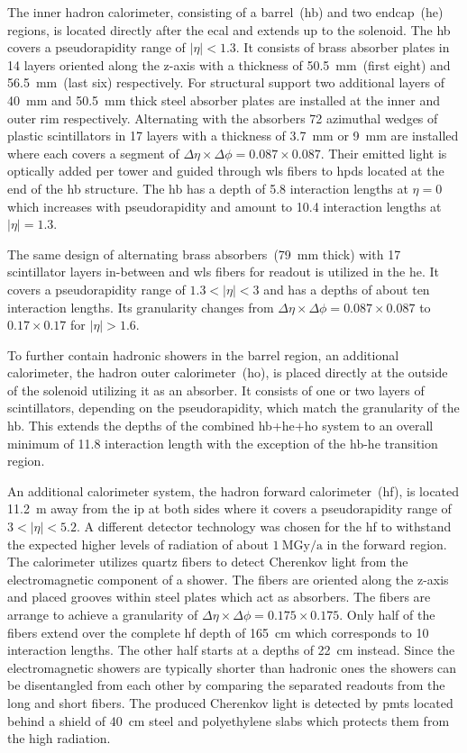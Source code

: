 The inner hadron calorimeter, consisting of a barrel~(\gls{hb}) and two endcap~(\gls{he}) regions, is located directly after the \gls{ecal} and extends up to the solenoid. The \gls{hb} covers a pseudorapidity range of $|\eta|<1.3$. It consists of brass absorber plates in 14 layers oriented along the z-axis with a thickness of 50.5~mm~(first eight) and 56.5~mm~(last six) respectively. For structural support two additional layers of 40~mm and 50.5~mm thick steel absorber plates are installed at the inner and outer rim respectively. Alternating with the absorbers 72 azimuthal wedges of plastic scintillators in 17 layers with a thickness of 3.7~mm or 9~mm are installed where each covers a segment of $\Delta\eta\times\Delta\phi=0.087\times0.087$. Their emitted light is optically added per tower and guided through \gls{wls} fibers to \glspl{hpd} located at the end of the \gls{hb} structure. The \gls{hb} has a depth of 5.8 interaction lengths at $\eta=0$ which increases with pseudorapidity and amount to 10.4 interaction lengths at $|\eta|=1.3$. 

The same design of alternating brass absorbers~(79~mm thick) with 17 scintillator layers in-between and \gls{wls} fibers for readout is utilized in the \gls{he}. It covers a pseudorapidity range of $1.3<|\eta|<3$ and has a depths of about ten interaction lengths. Its granularity changes from $\Delta\eta\times\Delta\phi=0.087\times0.087$ to $0.17\times0.17$ for $|\eta|>1.6$.

To further contain hadronic showers in the barrel region, an additional calorimeter, the hadron outer calorimeter~(\gls{ho}), is placed directly at the outside of the solenoid utilizing it as an absorber. It consists of one or two layers of scintillators, depending on the pseudorapidity, which match the granularity of the \gls{hb}. This extends the depths of the combined \gls{hb}+\gls{he}+\gls{ho} system to an overall minimum of 11.8 interaction length with the exception of the \gls{hb}-\gls{he} transition region.

An additional calorimeter system, the hadron forward calorimeter~(\gls{hf}), is located 11.2~m away from the \gls{ip} at both sides where it covers a pseudorapidity range of $3<|\eta|<5.2$. A different detector technology was chosen for the \gls{hf} to withstand the expected higher levels of radiation of about $1~\mathrm{MGy/a}$ in the forward region. The calorimeter utilizes quartz fibers to detect Cherenkov light from the electromagnetic component of a shower. The fibers are oriented along the z-axis and placed grooves within steel plates which act as absorbers. The fibers are arrange to achieve a granularity of $\Delta\eta\times\Delta\phi=0.175\times0.175$. Only half of the fibers extend over the complete \gls{hf} depth of 165~cm which corresponds to 10 interaction lengths. The other half starts at a depths of 22~cm instead. Since the electromagnetic showers are typically shorter than hadronic ones the showers can be disentangled from each other by comparing the separated readouts from the long and short fibers. The produced Cherenkov light is detected by \glspl{pmt} located behind a shield of 40~cm steel and polyethylene slabs which protects them from the high radiation.

